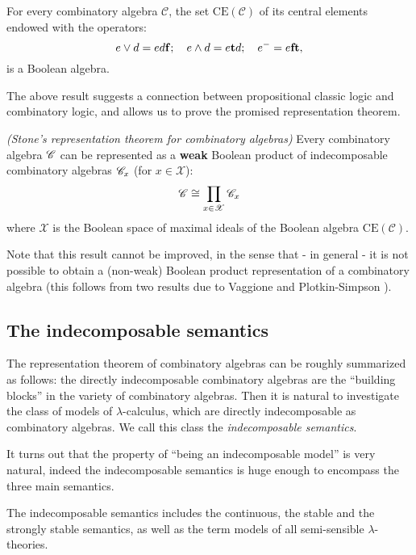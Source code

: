 \documentclass[english]{llncs}
\newcommand{\alg}[1]{\mathscr{#1}} \newcommand{\CE}[1]{{\mathrm{CE}(#1)}} \newcommand{\IE}[1]{{\mathrm{IE}(#1)}} \newcommand{\class}[1]{\mathbb{#1}}
\newcommand\sst{{\bf t}}
\newcommand\ssf{{\bf f}}
\begin{document}
\begin{theorem} \cite[Thm.~4.3.6]{ManzonettoTh} For every combinatory algebra $\alg{C}$, the set $\CE{\alg{C}}$ of its central elements endowed with the operators:
$$
   e\lor d = ed\ssf; \quad e\land d = e\sst d;\quad e^- = e\ssf\sst,
$$
is a Boolean algebra. 
\end{theorem}

The above result suggests a connection between propositional classic logic and combinatory logic,
and allows us to prove the promised representation theorem.

\begin{theorem} \cite[Thm.~4.3.7]{ManzonettoTh} {\em (Stone's representation theorem for combinatory algebras)}
Every combinatory algebra $\mathscr{C}$ can be represented as a {\bf weak} Boolean product of indecomposable combinatory algebras $\mathscr{C}_x$ (for $x\in \alg{X}$):
$$
    \ca{C} \cong \prod_{x\in \alg{X}} \ca{C}_x
$$
where $\alg{X}$ is the Boolean space of maximal ideals of the Boolean algebra $\CE{\alg{C}}$.
\end{theorem}

Note that this result cannot be improved, in the sense that - in general - it is not possible to obtain a (non-weak) Boolean product 
representation of a combinatory algebra (this follows from two results due to Vaggione \cite{Vaggione96a} and Plotkin-Simpson \cite[Lemma~3.14]{SelingerTh}).

\subsection{The indecomposable semantics} 

The representation theorem of combinatory algebras can be roughly summarized as follows: 
the directly indecomposable combinatory algebras are the ``building blocks'' in the variety of combinatory algebras.
Then it is natural to investigate the class of models of $\lambda$-calculus, which are directly indecomposable
as combinatory algebras. We call this class the {\em indecomposable semantics}.

It turns out that the property of ``being an indecomposable model'' is very natural, indeed
the indecomposable semantics is huge enough to encompass the three main semantics. 

\begin{theorem}\cite[Cor.~4.4.9]{ManzonettoTh} The indecomposable semantics includes the continuous, the stable and the strongly stable semantics, as well as the term models 
of all semi-sensible $\lambda$-theories.
\end{theorem}
\end{document}
